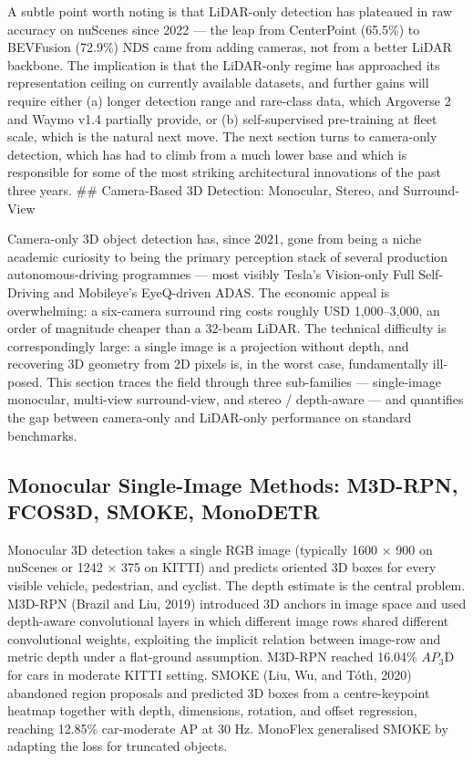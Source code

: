 A subtle point worth noting is that LiDAR-only detection has plateaued in raw accuracy on nuScenes since 2022 --- the leap from CenterPoint (65.5\%) to BEVFusion (72.9\%) NDS came from adding cameras, not from a better LiDAR backbone. The implication is that the LiDAR-only regime has approached its representation ceiling on currently available datasets, and further gains will require either (a) longer detection range and rare-class data, which Argoverse 2 and Waymo v1.4 partially provide, or (b) self-supervised pre-training at fleet scale, which is the natural next move. The next section turns to camera-only detection, which has had to climb from a much lower base and which is responsible for some of the most striking architectural innovations of the past three years.
\#\# Camera-Based 3D Detection: Monocular, Stereo, and Surround-View

Camera-only 3D object detection has, since 2021, gone from being a niche academic curiosity to being the primary perception stack of several production autonomous-driving programmes --- most visibly Tesla's Vision-only Full Self-Driving and Mobileye's EyeQ-driven ADAS. The economic appeal is overwhelming: a six-camera surround ring costs roughly USD 1,000--3,000, an order of magnitude cheaper than a 32-beam LiDAR. The technical difficulty is correspondingly large: a single image is a projection without depth, and recovering 3D geometry from 2D pixels is, in the worst case, fundamentally ill-posed. This section traces the field through three sub-families --- single-image monocular, multi-view surround-view, and stereo / depth-aware --- and quantifies the gap between camera-only and LiDAR-only performance on standard benchmarks.

\subsection{Monocular Single-Image Methods: M3D-RPN, FCOS3D, SMOKE, MonoDETR}\label{monocular-single-image-methods-m3d-rpn-fcos3d-smoke-monodetr}

Monocular 3D detection takes a single RGB image (typically 1600 × 900 on nuScenes or 1242 × 375 on KITTI) and predicts oriented 3D boxes for every visible vehicle, pedestrian, and cyclist. The depth estimate is the central problem. M3D-RPN (Brazil and Liu, 2019) introduced 3D anchors in image space and used depth-aware convolutional layers in which different image rows shared different convolutional weights, exploiting the implicit relation between image-row and metric depth under a flat-ground assumption. M3D-RPN reached 16.04\% \(AP_3\)D for cars in moderate KITTI setting. SMOKE (Liu, Wu, and Tóth, 2020) abandoned region proposals and predicted 3D boxes from a centre-keypoint heatmap together with depth, dimensions, rotation, and offset regression, reaching 12.85\% car-moderate AP at 30 Hz. MonoFlex generalised SMOKE by adapting the loss for truncated objects.

